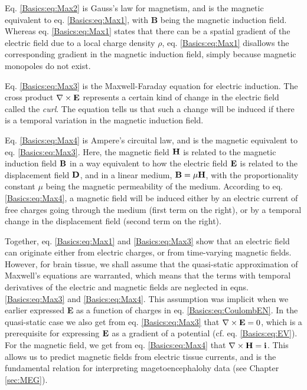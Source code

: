 Eq. \ref{Basics:eq:Max2} is Gauss's law for magnetism, and is the magnetic equivalent to eq. \ref{Basics:eq:Max1}, with {\bf B} being the magnetic induction field.  Whereas eq. \ref{Basics:eq:Max1} states that there can be a spatial gradient of the electric field due to a local charge density $\rho$, eq. \ref{Basics:eq:Max1} disallows the corresponding gradient in the magnetic induction field, simply because magnetic monopoles do not exist. 

Eq. \ref{Basics:eq:Max3} is the Maxwell-Faraday equation for electric induction. The cross product $\nabla \times {\bf E}$ represents a certain kind of change in the electric field called the \textit{curl}. The equation tells us that such a change will be induced if there is a temporal variation in the magnetic induction field. 

Eq.  \ref{Basics:eq:Max4} is Ampere's circuital law, and is the magnetic equivalent to eq. \ref{Basics:eq:Max3}. Here, the magnetic field ${\bf H}$ is related to the magnetic induction field ${\bf B}$ in a way equivalent to how the electric field ${\bf E}$ is related to the displacement field ${\bf D}$, and in a linear medium, ${\bf B} = \mu{\bf H}$, with the proportionality constant $\mu$ being the magnetic permeability of the medium. According to eq. \ref{Basics:eq:Max4}, a magnetic field will be induced either by an electric current of free charges going through the medium (first term on the right), or by a temporal change in the displacement field (second term on the right). 

Together, eq. \ref{Basics:eq:Max1} and \ref{Basics:eq:Max3} show that an electric field can originate either from electric charges, or from time-varying magnetic fields. However, for brain tissue, we shall assume that the quasi-static approximation of Maxwell's equations are warranted, which means that the terms with temporal derivatives of the electric and magnetic fields are neglected in eqns. \ref{Basics:eq:Max3} and  \ref{Basics:eq:Max4}. This assumption was implicit when we earlier expressed {\bf E} as a function of charges in eq. \ref{Basics:eq:CoulombEN}. In the quasi-static case we also get from eq. \ref{Basics:eq:Max3} that $\nabla \times {\bf E} = 0$, which is a prerequisite for expressing ${\bf E}$ as a gradient of a potential (cf. eq. \ref{Basics:eq:EV}). For the magnetic field, we get from eq. \ref{Basics:eq:Max4} that $\nabla \times {\bf H} = \bf{i}$. This allows us to predict magnetic fields from electric tissue currents, and is the fundamental relation for interpreting magetoencephalohy data (see Chapter \ref{sec:MEG}).

